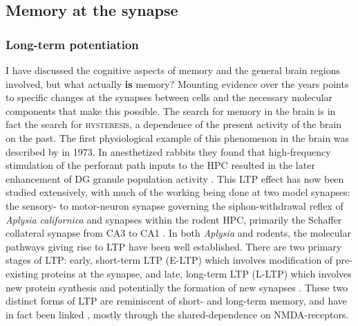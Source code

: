 
\subsection{Memory at the synapse}

\subsubsection{Long-term potentiation}
\label{sec:intro:memory:LTP}
I have discussed the cognitive aspects of memory and the general brain regions involved, but what actually \textbf{is} memory?
Mounting evidence over the years points to specific changes at the synapses between cells and the necessary molecular components that make this possible.
The search for memory in the brain is in fact the search for \textsc{hysteresis}, a dependence of the present activity of the brain on the past.
The first physiological example of this phenomenon in the brain was described by \citeauthor{Bliss1973} in 1973.
In anesthetized rabbits they found that high-frequency stimulation of the perforant path inputs to the \ac{HPC} resulted in the later enhancement of \ac{DG} granule population activity \citep{Bliss1973}.
This \ac{LTP} effect has now been studied extensively, with much of the working being done at two model synapses: the sensory- to motor-neuron synapse governing the siphon-withdrawal reflex of \emph{Aplysia californica} and synapses within the rodent \ac{HPC}, primarily the Schaffer collateral synapse from CA3 to CA1 \citep{Kandel2001, Bailey2008}.
In both \emph{Aplysia} and rodents, the molecular pathways giving rise to \ac{LTP} have been well established.
There are two primary stages of \ac{LTP}: early, short-term LTP (E-LTP) which involves modification of pre-existing proteins at the synapse, and late, long-term LTP (L-LTP) which involves new protein synthesis and potentially the formation of new synapses \citep{Frey1988, Bailey2008}.
These two distinct forms of LTP are reminiscent of short- and long-term memory, and have in fact been linked \citep{Moser1998a, Hernandez2008}, mostly through the shared-dependence on NMDA-receptors.

